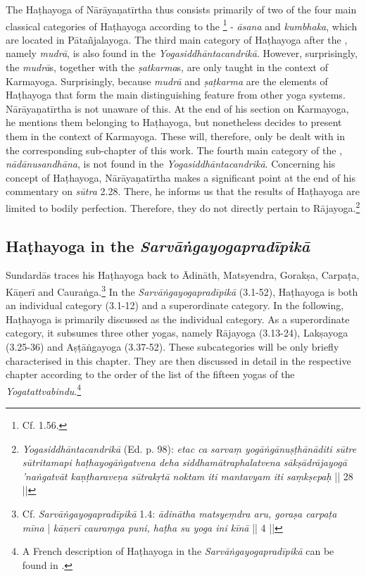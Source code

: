 The Haṭhayoga of Nārāyaṇatīrtha thus consists primarily of two of the four main classical categories of Haṭhayoga according to the \footnote{Cf.  1.56.} - \textit{āsana} and \textit{kumbhaka}, which are located in Pātañjalayoga. The third main category of Haṭhayoga after the , namely \textit{mudrā}, is also found in the \textit{Yogasiddhāntacandrikā}. However, surprisingly, the \textit{mudrā}s, together with the \textit{ṣatkarma}s, are only taught in the context of Karmayoga. Surprisingly, because \textit{mudrā} and \textit{ṣaṭkarma} are the elements of Haṭhayoga that form the main distinguishing feature from other yoga systems. Nārāyaṇatīrtha is not unaware of this. At the end of his section on Karmayoga, he mentions them belonging to Haṭhayoga, but nonetheless decides to present them in the context of Karmayoga. These will, therefore, only be dealt with in the corresponding sub-chapter of this work. The fourth main category of the , \textit{nādānusandhāna}, is not found in the \textit{Yogasiddhāntacandrikā}. Concerning his concept of Haṭhayoga, Nārāyaṇatīrtha makes a significant point at the end of his commentary on \textit{sūtra} 2.28. There, he informs us that the results of Haṭhayoga are limited to bodily perfection. Therefore, they do not directly pertain to Rājayoga.\footnote{\emph{Yogasiddhāntacandrikā} (Ed. p. 98): \textit{etac ca sarvaṃ yogāṅgānuṣṭhānāditi sūtre sūtritamapi haṭhayogāṅgatvena deha siddhamātraphalatvena sākṣādrājayogā 'naṅgatvāt kaṇṭharaveṇa sūtrakṛtā noktam iti mantavyam iti saṃkṣepaḥ} || 28 ||}

\subsection{Haṭhayoga in the \textit{Sarvāṅgayogapradīpikā}}

Sundardās traces his Haṭhayoga back to Ādināth, Matsyendra, Gorakṣa, Carpaṭa, Kāṇerī and Cauraṅga.\footnote{Cf. \textit{Sarvāṅgayogapradīpikā} 1.4: \textit{ādinātha matsyeṃdra aru, goraṣa carpaṭa mīna} | \textit{kāṇerī cauraṃga puni, haṭha su yoga ini kīnā} || 4 ||} In the \textit{Sarvāṅgayogapradīpikā} (3.1-52), Haṭhayoga is both an individual category (3.1-12) and a superordinate category. In the following, Haṭhayoga is primarily discussed as the individual category. As a superordinate category, it subsumes three other yogas, namely Rājayoga (3.13-24), Lakṣayoga (3.25-36) and Aṣṭāṅgayoga (3.37-52). These subcategories will be only briefly characterised in this chapter. They are then discussed in detail in the respective chapter according to the order of the list of the fifteen yogas of the \textit{Yogatattvabindu}.\footnote{A French description of Haṭhayoga in the \textit{Sarvāṅgayogapradīpikā} can be found in \citeauthor[2014: 701-709]{burger2014sarvangayogapradipika}.}

